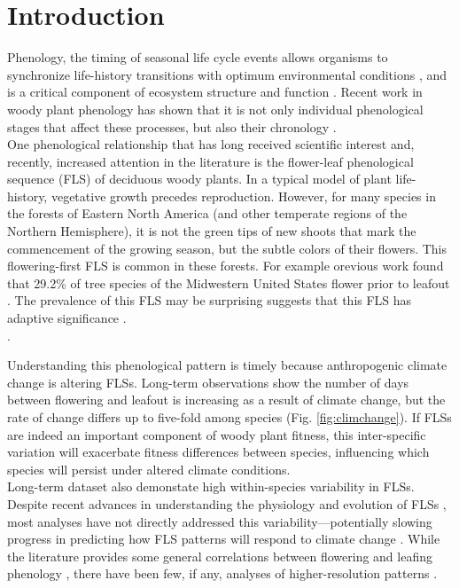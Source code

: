 \documentclass[11pt]{article}
\begin{document}
\section*{Introduction}
Phenology, the timing of seasonal life cycle events allows organisms to synchronize life-history transitions with optimum environmental conditions \citep{Forrest2010}, and is a critical component of ecosystem structure and function \citep{Cleland2007,Piao2007}. Recent work in woody plant phenology has shown that it is not only individual phenological stages that affect these processes, but also their chronology \citep{Ettinger2018}.\\

\noindent One phenological relationship that has long received scientific interest \citep[see][]{Robertson1895} and, recently, increased attention in the literature \citep{Savage2019, Gougherty2018} is the flower-leaf phenological sequence (FLS) of deciduous woody plants. In a typical model of plant life-history, vegetative growth precedes reproduction. However, for many species in the forests of Eastern North America (and other temperate regions of the Northern Hemisphere), it is not the green tips of new shoots that mark the commencement of the growing season, but the subtle colors of their flowers. This flowering-first FLS is common in these forests. For example orevious work found that 29.2\% of tree species of the Midwestern United States flower prior to leafout \citep{Gougherty2018}. The prevalence of this FLS may be surprising suggests that this FLS has adaptive significance \citep{Rathcke_1985}.\\  .

\noindent Understanding this phenological pattern is timely because anthropogenic climate change is altering FLSs. Long-term observations show the number of days between flowering and leafout is increasing as a result of climate change, but the rate of change differs up to five-fold among species (Fig. \ref{fig:climchange}).  If FLSs are indeed an important component of woody plant fitness, this inter-specific variation will exacerbate fitness differences between species, influencing which species will persist under altered climate conditions.\\ 

\noindent Long-term dataset also demonstate high within-species variability in FLSs. Despite recent advances in understanding the physiology and evolution of FLSs \citep{Gougherty2018,Savage2019}, most analyses have not directly addressed this variability---potentially slowing progress in predicting how FLS patterns will respond to climate change . While the literature provides some general correlations between flowering and leafing phenology \citep{Lechowicz_1995, Ettinger2018}, there have been few, if any, analyses of higher-resolution patterns \citep{Gougherty2018}. \\
\end{document}
